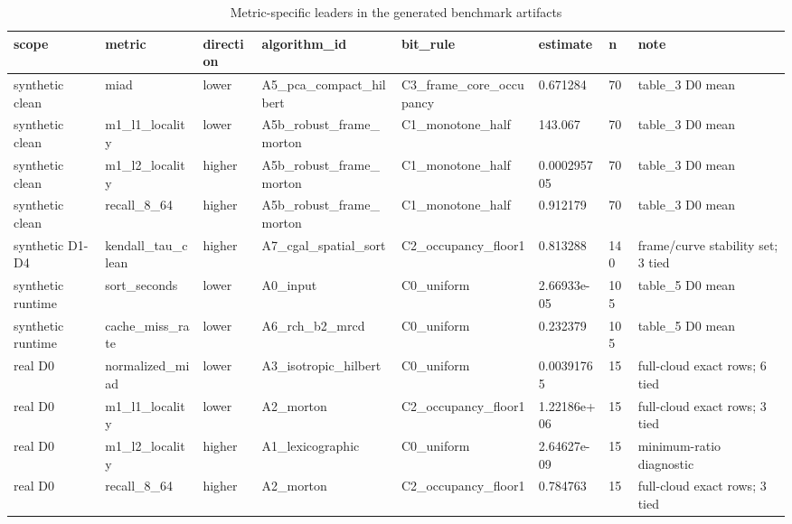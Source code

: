 \begin{table}
\caption{Metric-specific leaders in the generated benchmark artifacts}
\label{tab:mixed_metric_leaders}
\begin{tabular}{llllllll}
\toprule
scope & metric & direction & algorithm\_id & bit\_rule & estimate & n & note \\
\midrule
synthetic clean & miad & lower & A5\_pca\_compact\_hilbert & C3\_frame\_core\_occupancy & 0.671284 & 70 & table\_3 D0 mean \\
synthetic clean & m1\_l1\_locality & lower & A5b\_robust\_frame\_morton & C1\_monotone\_half & 143.067 & 70 & table\_3 D0 mean \\
synthetic clean & m1\_l2\_locality & higher & A5b\_robust\_frame\_morton & C1\_monotone\_half & 0.000295705 & 70 & table\_3 D0 mean \\
synthetic clean & recall\_8\_64 & higher & A5b\_robust\_frame\_morton & C1\_monotone\_half & 0.912179 & 70 & table\_3 D0 mean \\
synthetic D1-D4 & kendall\_tau\_clean & higher & A7\_cgal\_spatial\_sort & C2\_occupancy\_floor1 & 0.813288 & 140 & frame/curve stability set; 3 tied \\
synthetic runtime & sort\_seconds & lower & A0\_input & C0\_uniform & 2.66933e-05 & 105 & table\_5 D0 mean \\
synthetic runtime & cache\_miss\_rate & lower & A6\_rch\_b2\_mrcd & C0\_uniform & 0.232379 & 105 & table\_5 D0 mean \\
real D0 & normalized\_miad & lower & A3\_isotropic\_hilbert & C0\_uniform & 0.00391765 & 15 & full-cloud exact rows; 6 tied \\
real D0 & m1\_l1\_locality & lower & A2\_morton & C2\_occupancy\_floor1 & 1.22186e+06 & 15 & full-cloud exact rows; 3 tied \\
real D0 & m1\_l2\_locality & higher & A1\_lexicographic & C0\_uniform & 2.64627e-09 & 15 & minimum-ratio diagnostic \\
real D0 & recall\_8\_64 & higher & A2\_morton & C2\_occupancy\_floor1 & 0.784763 & 15 & full-cloud exact rows; 3 tied \\
\bottomrule
\end{tabular}
\end{table}
